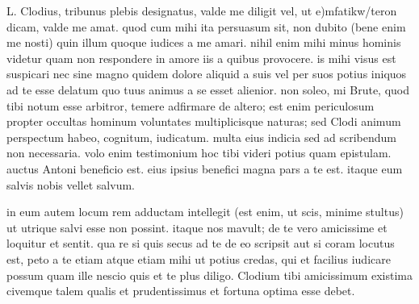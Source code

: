 


 L. Clodius, tribunus plebis designatus, valde me diligit vel, ut e)mfatikw/teron dicam, valde me amat. quod cum mihi ita persuasum sit, non dubito (bene enim me nosti) quin illum quoque iudices a me amari. nihil enim mihi minus hominis videtur quam non respondere in amore iis a quibus provocere. is mihi visus est suspicari nec sine magno quidem dolore aliquid a suis vel per suos potius iniquos ad te esse delatum quo tuus animus a se esset alienior. non soleo, mi Brute, quod tibi notum esse arbitror, temere adfirmare de altero; est enim periculosum propter occultas hominum voluntates multiplicisque naturas; sed Clodi animum perspectum habeo, cognitum, iudicatum. multa eius indicia sed ad scribendum non necessaria. volo enim testimonium hoc tibi videri potius quam epistulam. auctus Antoni beneficio est. eius ipsius benefici magna pars a te est. itaque eum salvis nobis vellet salvum.

 in eum autem locum rem adductam intellegit (est enim, ut scis, minime stultus) ut utrique salvi esse non possint. itaque nos mavult; de te vero amicissime et loquitur et sentit. qua re si quis secus ad te de eo scripsit aut si coram locutus est, peto a te etiam atque etiam mihi ut potius credas, qui et facilius iudicare possum quam ille nescio quis et te plus diligo. Clodium tibi amicissimum existima civemque talem qualis et prudentissimus et fortuna optima esse debet.
